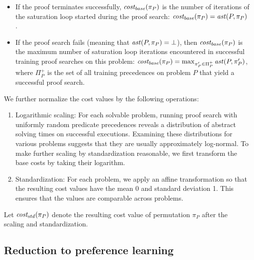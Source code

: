 \begin{itemize}
	\item If the proof terminates successfully,
	\(\operatorname{\mathit{cost_{base}}}(\pi_P)\) is the number of iterations of the saturation loop
	started during the proof search: \(\operatorname{\mathit{cost_{base}}}(\pi_P) = \operatorname{\mathit{ast}}(P, \pi_P)\).
	\item If the proof search fails (meaning that \(\operatorname{\mathit{ast}}(P, \pi_P) = \bot\)),
	then \(\operatorname{\mathit{cost_{base}}}(\pi_P)\) is the maximum number
	of saturation loop iterations encountered in successful training proof searches on this problem:
	\(\operatorname{\mathit{cost_{base}}}(\pi_P) = \max_{\pi_P' \in \Pi^+_P} \operatorname{\mathit{ast}}(P, \pi_P')\),
	where \(\Pi^+_P\) is the set of all training precedences on problem \(P\)
	that yield a successful proof search.
\end{itemize}
We further normalize the cost values by the following operations:
\begin{enumerate}
	\item Logarithmic scaling:
	For each solvable problem, running proof search with uniformly random predicate precedences
	reveals a distribution of abstract solving times on successful executions.
	Examining these distributions for various problems suggests that they are usually
	approximately log-normal.
	To make further scaling by standardization reasonable,
	we first transform the base costs by taking their logarithm.
	\item Standardization: %
	For each problem,
	we apply an affine transformation so that the resulting cost values
	have the mean 0 and standard deviation 1.
	This ensures that the values are comparable across problems.
\end{enumerate}
Let \(\operatorname{\mathit{cost_{std}}}(\pi_P)\) denote the resulting cost value of permutation \(\pi_P\)
after the scaling and standardization.

\subsection{Reduction to preference learning}

